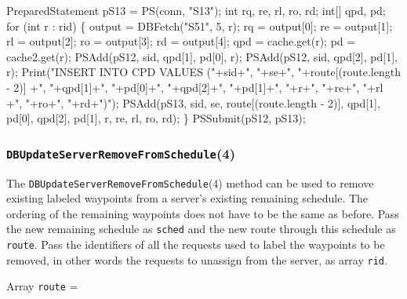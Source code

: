 \documentclass{article}
\def\nwendcode{\endtrivlist \endgroup}      %
\let\nwdocspar=\par
\theoremstyle{definition}                   %
\begin{document}
PreparedStatement pS13 = PS(conn, "S13");
int rq, re, rl, ro, rd;
int[] qpd, pd;
for (int r : rid) \{
  output = DBFetch("S51", 5, r);
  rq = output[0];
  re = output[1];
  rl = output[2];
  ro = output[3];
  rd = output[4];
  qpd = cache.get(r);
  pd = cache2.get(r);
  PSAdd(pS12, sid, qpd[1], pd[0], r);
  PSAdd(pS12, sid, qpd[2], pd[1], r);
  Print("INSERT INTO CPD VALUES ("+sid+", "+se+", "+route[(route.length - 2)]
    +", "+qpd[1]+", "+pd[0]+", "+qpd[2]+", "+pd[1]+", "+r+", "+re+", "+rl
    +", "+ro+", "+rd+")");
  PSAdd(pS13, sid, se, route[(route.length - 2)], qpd[1], pd[0], qpd[2], pd[1],
        r, re, rl, ro, rd);
\}
PSSubmit(pS12, pS13);
\nwendcode{}\nwdocspar

\subsubsection{{\tt{}\protect{}DBUpdateServerRemoveFromSchedule}(4)}
The {\tt{}\protect{}DBUpdateServerRemoveFromSchedule}(4) method can be used to remove
existing labeled waypoints from a server's existing remaining schedule. The
ordering of the remaining waypoints does not have to be the same as before.
Pass the new remaining schedule as {\tt{}sched} and the new route through this
schedule as {\tt{}route}. Pass the identifiers of all the requests used to label
the waypoints to be removed, in other words the requests to unassign from the
server, as array {\tt{}rid}.

Array {\tt{}route} =

\noindent
{}
\end{document}
